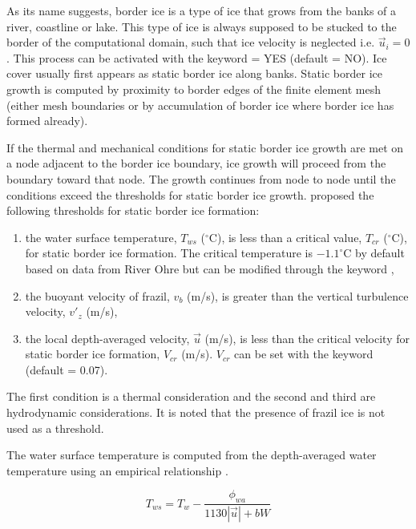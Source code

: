 As its name suggests, border ice is a type of ice that grows from the banks of a river, coastline or lake.
This type of ice is always supposed to be stucked to the border of the computational domain, such that
ice velocity is neglected i.e. $\vec{u}_i = 0$.
This process can be activated with the keyword  = YES (default = NO).
Ice cover usually first appears as static border ice along banks. Static border ice growth is computed by proximity to border edges of the finite element mesh (either mesh boundaries or by accumulation of border ice where border ice has formed already).\newline

If the thermal and mechanical conditions for static border ice growth are met on a node adjacent to the border ice boundary, ice growth will proceed from the boundary toward that node. The growth continues from node to node until the conditions exceed the thresholds for static border ice growth.
\cite{matousek1984types} proposed the following thresholds for static border ice formation:
\begin{enumerate}
  \item the water surface temperature, $T_{ws}$ ($^{\circ}$C), is less than a critical value, $T_{cr}$ ($^{\circ}$C), for static border ice formation. The critical temperature is $-1.1^{\circ}$C by default based on data from River Ohre but can be modified through the keyword ,
  \item the buoyant velocity of frazil, $v_b$ (m/s), is greater than the vertical turbulence velocity, $v'_z$ (m/s),
  \item the local depth-averaged velocity, $\vec{u}$ (m/s), is less than the critical velocity for static border ice formation, $V_{cr}$ (m/s). $V_{cr}$ can be set with the keyword  (default = 0.07).
\end{enumerate}

The first condition is a thermal consideration and the second and third are hydrodynamic considerations. It is noted that the presence of frazil ice is not used as a threshold.\newline

The water surface temperature is computed from the depth-averaged water temperature using an empirical relationship \cite{matousek1984types} \cite{matousek1984regularity}.

\begin{equation} \label{eq:surf_temp}
T_{ws} = T_w - \dfrac{\phi_{wa}}{1130 |\vec{u}|+bW}
\end{equation}

